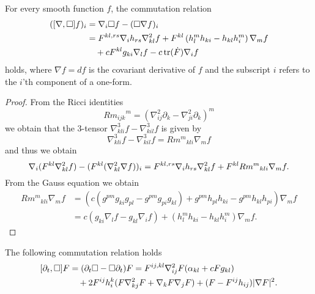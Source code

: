 \documentclass{amsart}
\begin{document}
\begin{lemma}
\label{lem:gradBox}
For every smooth function $f$, the commutation relation
\[
\begin{split}
([\nabla, \Box]f)_i &= \nabla_i \Box f - (\Box \nabla f)_i\\
                &= F^{kl,rs} \nabla_i h_{rs} \nabla^2_{kl} f + F^{kl}\left(h^{m}_{l}h_{ki} - h_{kl}h^{m}_{i}\right) \nabla_m f \\
&\quad + c F^{kl} g_{ki} \nabla_l f - c \operatorname{tr}(\dot{F}) \nabla_i f
\end{split}
\]
holds, where \(\nabla f = df\) is the covariant derivative of \(f\) and the subscript \(i\) refers to the \(i\)'th component of a one-form.
\end{lemma}
\begin{proof}
From the Ricci identities
\[
{Rm_{ijk}}^m  = \left(\nabla^2_{ij} \partial_k - \nabla^2_{ji} \partial_k\right)^m
\]
we obtain that the $3$-tensor $\nabla^3_{kli}f-\nabla^3_{kil}f$
is given by
\[
\nabla^3_{kli}f-\nabla^3_{kil}f={Rm^m}_{kli}\nabla_m f
\]
and thus we obtain
\[
\nabla_i (F^{kl} \nabla^2_{kl} f) - (F^{kl}(\nabla^2_{kl} \nabla f))_i = F^{kl,rs} \nabla_i h_{rs} \nabla^2_{kl}f + F^{kl}{Rm^{m}}_{kli} \nabla_m f.
\]
From the Gauss equation we obtain
\[
\begin{split}
{Rm^{m}}_{kli} \nabla_m f &= \left(c\left(g^{pm}g_{ki}g_{pl}  - g^{pm}g_{pi}g_{kl}\right) + g^{pm} h_{pl}h_{ki} - g^{pm}h_{kl}h_{pi}\right) \nabla_m f \\
&= c\left(g_{ki} \nabla_l f - g_{kl} \nabla_i f\right) + \left(h^{m}_{l}h_{ki} - h_{kl}h^{m}_{i}\right) \nabla_m f.
\end{split}
\]
\end{proof}
\begin{lemma}
\label{lem:deltBox}
The following commutation relation holds
\[
\begin{split}
[\partial_t, \Box] F &= (\partial_{t}\Box - \Box\partial_{t}) F = F^{ij,kl} \nabla^2_{ij} F (\alpha_{kl} + c F g_{kl}) \\
&\quad + 2F^{ij}h^{k}_{i} (F \nabla^2_{k
j} F + \nabla_k F \nabla_j F) + (F - F^{ij}h_{ij})| \nabla F|^{2}.
\end{split}
\]
\end{lemma}
\end{document}

